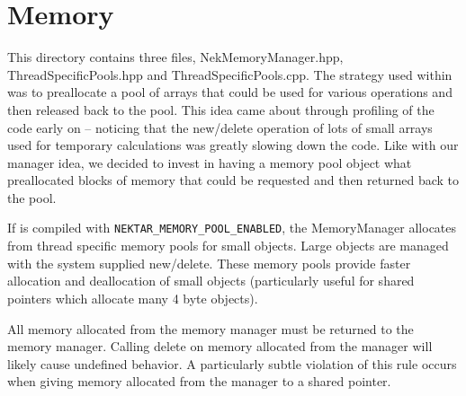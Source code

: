 %
\section{Memory}

This directory contains three files, NekMemoryManager.hpp, ThreadSpecificPools.hpp and ThreadSpecificPools.cpp.
The strategy used within {\nek} was to preallocate a pool of arrays that could be used for various operations and then
released back to the pool.  This idea came about through profiling of the code early on -- noticing that the new/delete
operation of lots of small arrays used for temporary calculations was greatly slowing down the code.  Like with our manager
idea, we decided to invest in having a memory pool object what preallocated blocks of memory that could be requested and
then returned back to the pool.

If {\nek} is compiled with \verb+NEKTAR_MEMORY_POOL_ENABLED+, the MemoryManager
allocates from thread specific memory pools for small objects. Large objects are managed with the 
system supplied new/delete. These memory pools provide faster allocation and deallocation
of small objects (particularly useful for shared pointers which
allocate many 4 byte objects).

All memory allocated from the memory manager must be returned
to the memory manager.  Calling delete on memory allocated from the
manager will likely cause undefined behavior.  A particularly subtle
violation of this rule occurs when giving memory allocated from the
manager to a shared pointer.
